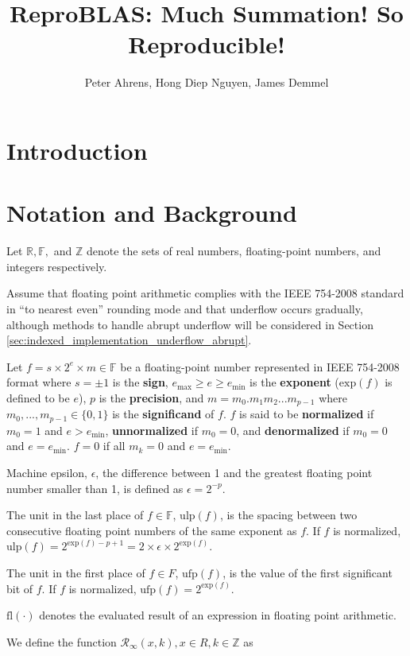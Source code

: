 \documentclass[12pt]{article}
\author{Peter Ahrens, Hong Diep Nguyen, James Demmel}
\title{ReproBLAS: Much Summation! So Reproducible!}
\providecommand{\R}{\ensuremath{\mathbb{R}}}
\providecommand{\F}{\ensuremath{\mathbb{F}}}
\providecommand{\Z}{\ensuremath{\mathbb{Z}}}
\providecommand{\exp}{\ensuremath{\text{exp}}}
\providecommand{\min}{\ensuremath{\text{min}}}
\providecommand{\max}{\ensuremath{\text{max}}}
\providecommand{\ulp}{\ensuremath{\text{ulp}}}
\providecommand{\ufp}{\ensuremath{\text{ufp}}}
\providecommand{\fl}{\ensuremath{\text{fl}}}
\providecommand{\roundtonearestinfty}{\ensuremath{\mathcal{R}_\text{$\infty$}}}
\theoremstyle{definition}
\numberwithin{equation}{section}
\begin{document}
\noindent
\maketitle
\tableofcontents
\newpage
\section{Introduction}
\section{Notation and Background}
  Let $\R, \F, $ and $\Z$ denote the sets of real numbers, floating-point numbers, and integers respectively.

  Assume that floating point arithmetic complies with the IEEE 754-2008 standard \cite{ieee754} in ``to nearest even'' rounding mode and that underflow occurs gradually, although methods to handle abrupt underflow will be considered in Section \ref{sec:indexed_implementation_underflow_abrupt}.

  Let $f = s \times 2^e \times m \in \F$ be a floating-point number represented in IEEE 754-2008 format \cite{ieee754} where $s = \pm 1$ is the \textbf{sign}, $e_{\max} \geq e \geq e_{\min}$ is the \textbf{exponent} ($\exp(f)$ is defined to be $e$), $p$ is the \textbf{precision}, and $m = m_0.m_1m_2...m_{p-1}$ where $m_0, ..., m_{p - 1} \in \{0, 1\}$ is the \textbf{significand} of $f$. $f$ is said to be \textbf{normalized} if $m_0 = 1$ and $e > e_{\min}$, \textbf{unnormalized} if $m_0 = 0$, and \textbf{denormalized} if $m_0 = 0$ and $e = e_{\min}$. $f = 0$ if all $m_k = 0$ and $e = e_{\min}$.

  Machine epsilon, $\epsilon$, the difference between 1 and the greatest floating point number smaller than 1, is defined as $\epsilon = 2^{-p}$.

  The unit in the last place of $f \in \F$, $\ulp(f)$, is the spacing between two consecutive floating point numbers of the same exponent as $f$. If $f$ is normalized, $\ulp(f) = 2^{\exp(f) - p + 1} = 2 \times \epsilon \times 2^{\exp(f)}$.

  The unit in the first place of $f \in F$, $\ufp(f)$, is the value of the first significant bit of $f$. If $f$ is normalized, $\ufp(f) = 2^{\exp(f)}$.

  $\fl(\cdot)$ denotes the evaluated result of an expression in floating point arithmetic.

  We define the function $\roundtonearestinfty(x, k), x \in R, k \in \Z$ as
\end{document}
